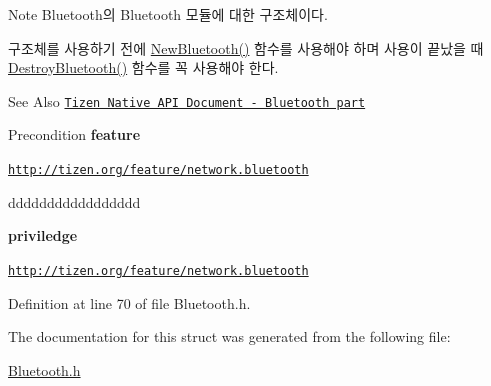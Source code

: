 \begin{DoxyNote}{Note}
Bluetooth의 Bluetooth 모듈에 대한 구조체이다. \par
 구조체를 사용하기 전에 \hyperlink{Bluetooth_8h_aedecb2f1b25b6d408a1880978b66712a}{New\-Bluetooth()} 함수를 사용해야 하며 사용이 끝났을 때 \hyperlink{Bluetooth_8h_a643b6a392ddbcf1c02bcfeb15ca52df8}{Destroy\-Bluetooth()} 함수를 꼭 사용해야 한다. 
\end{DoxyNote}
\begin{DoxySeeAlso}{See Also}
\href{https://developer.tizen.org/dev-guide/2.3.0/org.tizen.native.mobile.apireference/group__CAPI__NETWORK__BLUETOOTH__MODULE.html}{\tt Tizen Native A\-P\-I Document -\/ Bluetooth part} 
\end{DoxySeeAlso}
\begin{DoxyPrecond}{Precondition}
{\bfseries feature} \par

\begin{DoxyItemize}
\item \href{http://tizen.org/feature/network.bluetooth}{\tt http\-://tizen.\-org/feature/network.\-bluetooth} \par

\item ddddddddddddddddd \par
 {\bfseries priviledge} \par

\item \href{http://tizen.org/feature/network.bluetooth}{\tt http\-://tizen.\-org/feature/network.\-bluetooth} \par

\end{DoxyItemize}
\end{DoxyPrecond}


Definition at line 70 of file Bluetooth.\-h.



The documentation for this struct was generated from the following file\-:\begin{DoxyCompactItemize}
\item 
\hyperlink{Bluetooth_8h}{Bluetooth.\-h}\end{DoxyCompactItemize}
